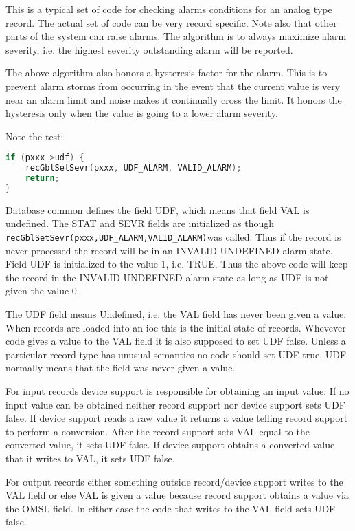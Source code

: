 This is a typical set of code for checking alarms conditions for an analog type record.
The actual set of code can be very record specific.
Note also that other parts of the system can raise alarms.
The algorithm is to always maximize alarm severity, i.e. the highest severity outstanding alarm will be reported.

The above algorithm also honors a hysteresis factor for the alarm.
This is to prevent alarm storms from occurring in the event that the current value is very near an alarm limit and noise makes it continually cross the limit.
It honors the hysteresis only when the value is going to a lower alarm severity.

Note the test:

\begin{lstlisting}[language=C]
if (pxxx->udf) {
    recGblSetSevr(pxxx, UDF_ALARM, VALID_ALARM);
    return;
}
\end{lstlisting}

Database common defines the field UDF, which means that field VAL is undefined.
The STAT and SEVR fields are initialized as though \verb|recGblSetSevr(pxxx,UDF_ALARM,VALID_ALARM)|was called.
Thus if the record is never processed the record will be in an INVALID UNDEFINED alarm state.
Field UDF is initialized to the value 1, i.e. TRUE.
Thus the above code will keep the record in the INVALID UNDEFINED alarm state as long as UDF is not given the value 0.

The UDF field means Undefined, i.e. the VAL field has never been given a value.
When records are loaded into an ioc this is the initial state of records.
Whevever code gives a value to the VAL field it is also supposed to set UDF false.
Unless a particular record type has unusual semantics no code should set UDF true.
UDF normally means that the field was never given a value.

For input records device support is responsible for obtaining an input value.
If no input value can be obtained neither record support nor device support sets UDF false.
If device support reads a raw value it returns a value telling record support to perform a conversion.
After the record support sets VAL equal to the converted value, it sets UDF false.
If device support obtains a converted value that it writes to VAL, it sets UDF false.

For output records either something outside record/device support writes to the VAL field or else VAL is given a value because record support obtains a value via the OMSL field.
In either case the code that writes to the VAL field sets UDF false.

